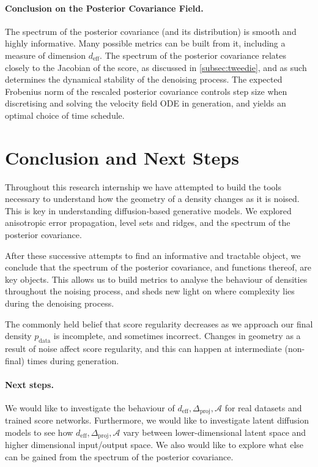 \documentclass{article}
\newcommand{\deff}{d_{\mathrm{eff}}}
\newcommand{\dproj}{\Delta_{\mathrm{proj}}}
\newcommand{\amb}{\mathcal{A}}
\theoremstyle{plain}
\theoremstyle{definition}
\theoremstyle{remark}
\begin{document}
\paragraph{Conclusion on the Posterior Covariance Field.} The spectrum of the posterior covariance (and its distribution) is smooth and highly informative. Many possible metrics can be built from it, including a measure of dimension $\deff$. The spectrum of the posterior covariance relates closely to the Jacobian of the score, as discussed in \autoref{subsec:tweedie}, and as such determines the dynamical stability of the denoising process. The expected Frobenius norm of the rescaled posterior covariance controls step size when discretising and solving the velocity field ODE in generation, and yields an optimal choice of time schedule.   

\newpage
\section{Conclusion and Next Steps}

Throughout this research internship we have attempted to build the tools necessary to understand how the geometry of a density changes as it is noised. This is key in understanding diffusion-based generative models. We explored anisotropic error propagation, level sets and ridges, and the spectrum of the posterior covariance. 

After these successive attempts to find an informative and tractable object, we conclude that the spectrum of the posterior covariance, and functions thereof, are key objects. This allows us to build metrics to analyse the behaviour of densities throughout the noising process, and sheds new light on where complexity lies during the denoising process.

The commonly held belief that score regularity decreases as we approach our final density $p_\text{data}$ is incomplete, and sometimes incorrect. Changes in geometry as a result of noise affect score regularity, and this can happen at intermediate (non-final) times during generation.

\paragraph{Next steps.}

We would like to investigate the behaviour of $\deff, \dproj, \amb$ for real datasets and trained score networks. Furthermore, we would like to investigate latent diffusion models to see how $\deff, \dproj, \amb$ vary between lower-dimensional latent space and higher dimensional input/output space. We also would like to explore what else can be gained from the spectrum of the posterior covariance.
\end{document}
